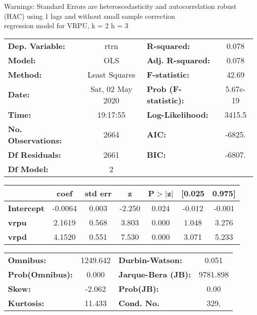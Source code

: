 Warnings: \newline
 [1] Standard Errors are heteroscedasticity and autocorrelation robust (HAC) using 1 lags and without small sample correction\\ 

regression model for VRPU, k = 2 h = 3\begin{center}
\begin{tabular}{lclc}
\toprule
\textbf{Dep. Variable:}    &       rtrn       & \textbf{  R-squared:         } &     0.078   \\
\textbf{Model:}            &       OLS        & \textbf{  Adj. R-squared:    } &     0.078   \\
\textbf{Method:}           &  Least Squares   & \textbf{  F-statistic:       } &     42.69   \\
\textbf{Date:}             & Sat, 02 May 2020 & \textbf{  Prob (F-statistic):} &  5.67e-19   \\
\textbf{Time:}             &     19:17:55     & \textbf{  Log-Likelihood:    } &    3415.5   \\
\textbf{No. Observations:} &        2664      & \textbf{  AIC:               } &    -6825.   \\
\textbf{Df Residuals:}     &        2661      & \textbf{  BIC:               } &    -6807.   \\
\textbf{Df Model:}         &           2      & \textbf{                     } &             \\
\bottomrule
\end{tabular}
\begin{tabular}{lcccccc}
                   & \textbf{coef} & \textbf{std err} & \textbf{z} & \textbf{P$> |$z$|$} & \textbf{[0.025} & \textbf{0.975]}  \\
\midrule
\textbf{Intercept} &      -0.0064  &        0.003     &    -2.250  &         0.024        &       -0.012    &       -0.001     \\
\textbf{vrpu}      &       2.1619  &        0.568     &     3.803  &         0.000        &        1.048    &        3.276     \\
\textbf{vrpd}      &       4.1520  &        0.551     &     7.530  &         0.000        &        3.071    &        5.233     \\
\bottomrule
\end{tabular}
\begin{tabular}{lclc}
\textbf{Omnibus:}       & 1249.642 & \textbf{  Durbin-Watson:     } &    0.051  \\
\textbf{Prob(Omnibus):} &   0.000  & \textbf{  Jarque-Bera (JB):  } & 9781.898  \\
\textbf{Skew:}          &  -2.062  & \textbf{  Prob(JB):          } &     0.00  \\
\textbf{Kurtosis:}      &  11.433  & \textbf{  Cond. No.          } &     329.  \\
\bottomrule
\end{tabular}
\end{center}

